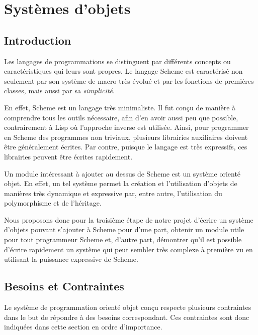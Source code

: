 

\chapter{Systèmes d'objets}

\section{Introduction}

Les langages de programmations se distinguent par différents concepts
ou caractéristiques qui leurs sont propres. Le langage Scheme est
caractérisé non seulement par son système de macro très évolué et par
les fonctions de premières classes, mais aussi par sa
\emph{simplicité}.

En effet, Scheme est un langage très minimaliste. Il fut conçu de
manière à comprendre tous les outils nécessaire, afin d'en avoir aussi
peu que possible, contrairement à Lisp où l'approche inverse est
utilisée. Ainsi, pour programmer en Scheme des programmes non
triviaux, plusieurs librairies auxiliaires doivent être généralement
écrites. Par contre, puisque le langage est très expressifs, ces
librairies peuvent être écrites rapidement.

Un module intéressant à ajouter au dessus de Scheme est un système
orienté objet. En effet, un tel système permet la création et
l'utilisation d'objets de manières très dynamique et expressive par,
entre autre, l'utilisation du polymorphisme et de l'héritage.

Nous proposons donc pour la troisième étape de notre projet d'écrire
un système d'objets pouvant s'ajouter à Scheme pour d'une part,
obtenir un module utile pour tout programmeur Scheme et, d'autre part,
démontrer qu'il est possible d'écrire rapidement un système qui peut
sembler très complexe à première vu en utilisant la puissance
expressive de Scheme.




  \section{Besoins et Contraintes}
    Le système de programmation orienté objet conçu respecte plusieurs
    contraintes dans le but de répondre à des besoins
    correspondant. Ces contraintes sont donc indiquées dans cette
    section en ordre d'importance.

